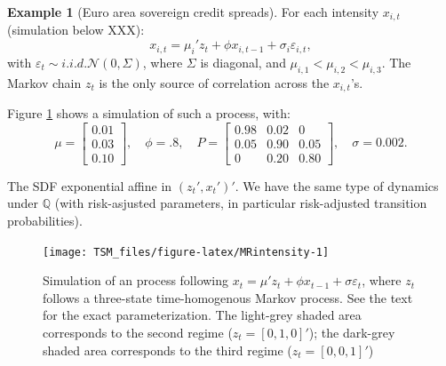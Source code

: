 \documentclass[
  12pt,
]{book}
\theoremstyle{definition}
\theoremstyle{definition}
\newtheorem{example}{Example}[chapter]
\theoremstyle{definition}
\theoremstyle{definition}
\theoremstyle{remark}
\begin{document}
\begin{example}[Euro area sovereign credit spreads]
For each intensity \(x_{i,t}\) (simulation below XXX):
\[
x_{i,t} = \mu_i'z_t + \phi x_{i,t-1} + \sigma_i \varepsilon_{i,t},
\]
with \(\varepsilon_{t} \sim i.i.d. \mathcal{N}(0,\Sigma)\), where \(\Sigma\) is diagonal, and \(\mu_{i,1} < \mu_{i,2} < \mu_{i,3}\).
The Markov chain \(z_t\) is the only source of correlation across the \(x_{i,t}\)'s.

Figure \ref{fig:MRintensity} shows a simulation of such a process, with:
\[
\mu=\left[\begin{array}{c}
0.01 \\ 0.03 \\ 0.10\end{array}\right],\quad \phi=.8 ,\quad P=\left[\begin{array}{ccc}
0.98 & 0.02 & 0\\
0.05 & 0.90 & 0.05\\
0 & 0.20 & 0.80
\end{array}\right],\quad \sigma = 0.002.
\]

The SDF exponential affine in \((z_t',x_t')'\). We have the same type of dynamics under \(\mathbb{Q}\) (with risk-asjusted parameters, in particular risk-adjusted transition probabilities).

\begin{figure}
\texttt{[image: TSM\_files/figure-latex/MRintensity-1]} \caption{Simulation of an process following $x_{t} = \mu'z_t + \phi x_{t-1} + \sigma \varepsilon_{t}$, where $z_t$ follows a three-state time-homogenous Markov process. See the text for the exact parameterization. The light-grey shaded area corresponds to the second regime ($z_t = [0,1,0]'$); the dark-grey shaded area corresponds to the third regime ($z_t = [0,0,1]'$)}\label{fig:MRintensity}
\end{figure}

\end{example}
\end{document}
